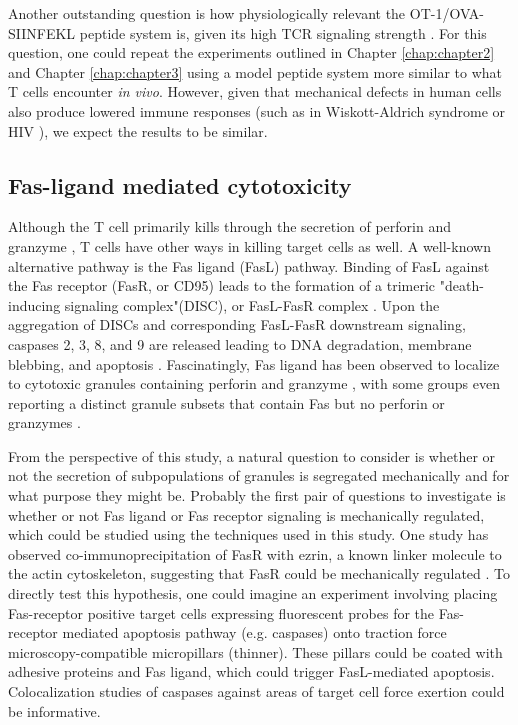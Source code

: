 Another outstanding question is how physiologically relevant the OT-1/OVA-SIINFEKL peptide system is, given its high TCR signaling strength \cite{Moran2011}. For this question, one could repeat the experiments outlined in Chapter \ref{chap:chapter2} and Chapter \ref{chap:chapter3} using a model peptide system more similar to what T cells encounter \textit{in vivo}. However, given that mechanical defects in human cells also produce lowered immune responses (such as in Wiskott-Aldrich syndrome or HIV \cite{Houmadi2018}), we expect the results to be similar.

\subsection{Fas-ligand mediated cytotoxicity}

Although the T cell primarily kills through the secretion of perforin and granzyme \cite{Yasukawa2000}, T cells have other ways in killing target cells as well. A well-known alternative pathway is the Fas ligand (FasL) pathway.  Binding of FasL against the Fas receptor (FasR, or CD95) leads to the formation of a trimeric "death-inducing signaling complex"(DISC), or FasL-FasR complex \cite{Yamada2017}. Upon the aggregation of DISCs and corresponding FasL-FasR downstream signaling, caspases 2, 3, 8, and 9 are released leading to DNA degradation, membrane blebbing, and apoptosis \cite{Parlato2000, Yamada2017}. Fascinatingly, Fas ligand has been observed to localize to cytotoxic granules containing perforin and granzyme \cite{Kojima2002}, with some groups even reporting a distinct granule subsets that contain Fas but no perforin or granzymes \cite{Chang2017, Schmidt2011, Schmidt2011_2}. 

From the perspective of this study,  a natural question to consider is whether or not the secretion of subpopulations of granules is segregated mechanically and for what purpose they might be. Probably the first pair of questions to investigate is whether or not Fas ligand or Fas receptor signaling is mechanically regulated, which could be studied using the techniques used in this study. One study has observed co-immunoprecipitation of FasR with ezrin, a known linker molecule to the actin cytoskeleton, suggesting that FasR could be mechanically regulated \cite{Parlato2000}. To directly test this hypothesis, one could imagine an experiment involving placing Fas-receptor positive target cells expressing fluorescent probes for the Fas-receptor mediated apoptosis pathway (e.g. caspases) onto traction force microscopy-compatible micropillars (thinner). These pillars could be coated with adhesive proteins and Fas ligand, which could trigger FasL-mediated apoptosis. Colocalization studies of caspases against areas of target cell force exertion could be informative.

